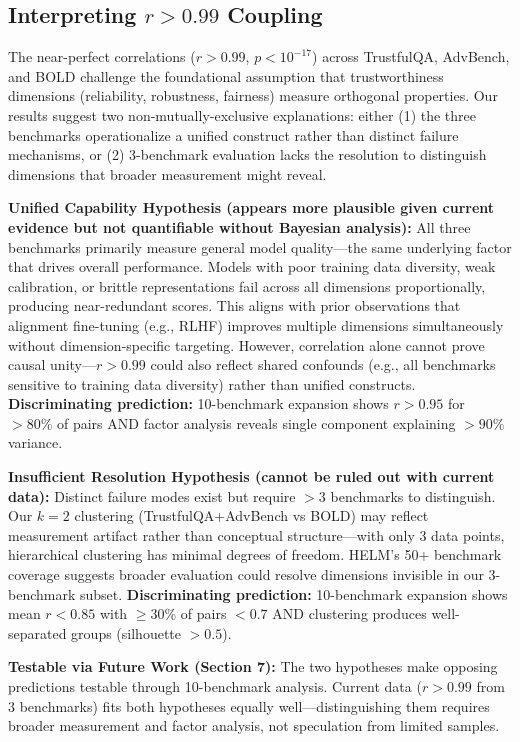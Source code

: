 \subsection{Interpreting $r > 0.99$ Coupling}

The near-perfect correlations ($r > 0.99$, $p < 10^{-17}$) across TrustfulQA, AdvBench, and BOLD challenge the foundational assumption that trustworthiness dimensions (reliability, robustness, fairness) measure orthogonal properties. Our results suggest two non-mutually-exclusive explanations: either (1) the three benchmarks operationalize a unified construct rather than distinct failure mechanisms, or (2) 3-benchmark evaluation lacks the resolution to distinguish dimensions that broader measurement might reveal.

\textbf{Unified Capability Hypothesis (appears more plausible given current evidence but not quantifiable without Bayesian analysis):} All three benchmarks primarily measure general model quality---the same underlying factor that drives overall performance. Models with poor training data diversity, weak calibration, or brittle representations fail across all dimensions proportionally, producing near-redundant scores. This aligns with prior observations that alignment fine-tuning (e.g., RLHF) improves multiple dimensions simultaneously without dimension-specific targeting. However, correlation alone cannot prove causal unity---$r > 0.99$ could also reflect shared confounds (e.g., all benchmarks sensitive to training data diversity) rather than unified constructs. \textbf{Discriminating prediction:} 10-benchmark expansion shows $r > 0.95$ for $>80\%$ of pairs AND factor analysis reveals single component explaining $>90\%$ variance.

\textbf{Insufficient Resolution Hypothesis (cannot be ruled out with current data):} Distinct failure modes exist but require $>3$ benchmarks to distinguish. Our $k=2$ clustering (TrustfulQA+AdvBench vs BOLD) may reflect measurement artifact rather than conceptual structure---with only 3 data points, hierarchical clustering has minimal degrees of freedom. HELM's 50+ benchmark coverage suggests broader evaluation could resolve dimensions invisible in our 3-benchmark subset. \textbf{Discriminating prediction:} 10-benchmark expansion shows mean $r < 0.85$ with $\geq 30\%$ of pairs $< 0.7$ AND clustering produces well-separated groups (silhouette $> 0.5$).

\textbf{Testable via Future Work (Section 7):} The two hypotheses make opposing predictions testable through 10-benchmark analysis. Current data ($r > 0.99$ from 3 benchmarks) fits both hypotheses equally well---distinguishing them requires broader measurement and factor analysis, not speculation from limited samples.

